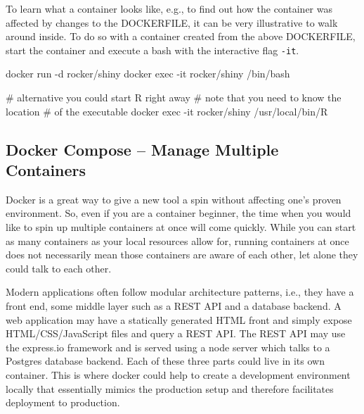 \documentclass[
  12pt,
  letterpaper,
]{krantz}
\newenvironment{Shaded}{\begin{snugshade}}{\end{snugshade}}
\newcommand{\AttributeTok}[1]{\textcolor[rgb]{0.40,0.45,0.13}{#1}}
\newcommand{\CommentTok}[1]{\textcolor[rgb]{0.37,0.37,0.37}{#1}}
\newcommand{\ExtensionTok}[1]{\textcolor[rgb]{0.00,0.23,0.31}{#1}}
\newcommand{\NormalTok}[1]{\textcolor[rgb]{0.00,0.23,0.31}{#1}}
\begin{document}
To learn what a container looks like, e.g., to find out how the
container was affected by changes to the DOCKERFILE,
it can be very illustrative to walk around inside. To do so with a
container created from the above DOCKERFILE, start the
container and execute a bash with the interactive flag \texttt{-it}.

\begin{Shaded}
\begin{Highlighting}[]
\ExtensionTok{docker}\NormalTok{ run }\AttributeTok{{-}d}\NormalTok{ rocker/shiny}
\ExtensionTok{docker}\NormalTok{ exec }\AttributeTok{{-}it}\NormalTok{ rocker/shiny /bin/bash}

\CommentTok{\# alternative you could start R right away}
\CommentTok{\# note that you need to know the location }
\CommentTok{\# of the executable}
\ExtensionTok{docker}\NormalTok{ exec }\AttributeTok{{-}it}\NormalTok{ rocker/shiny /usr/local/bin/R}
\end{Highlighting}
\end{Shaded}

\hypertarget{docker-compose-manage-multiple-containers}{%
\subsection{Docker Compose -- Manage Multiple
Containers}\label{docker-compose-manage-multiple-containers}}

Docker is a great way to give a new tool a spin without
affecting one's proven environment. So, even if you are a container
beginner, the time when you would like to spin up multiple containers at
once will come quickly. While you can start as many containers as your
local resources allow for, running containers at once does not
necessarily mean those containers are aware of each other, let alone
they could talk to each other.

Modern applications often follow modular architecture patterns, i.e.,
they have a front end, some middle layer such as a REST API and a
database backend. A web application may have a
statically generated HTML front and simply expose
HTML/CSS/JavaScript files and query a REST API. The REST API may use the
express.io framework and is served using a node server which talks to a
Postgres database backend. Each of these three parts
could live in its own container. This is where docker could help to
create a development environment locally that essentially mimics the
production setup and therefore facilitates deployment to production.
\end{document}
